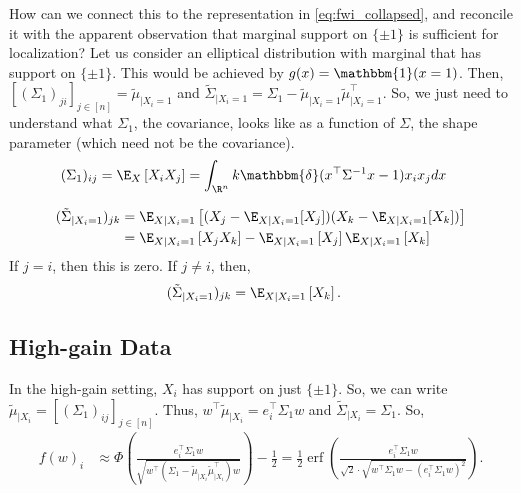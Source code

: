 \documentclass{article}
\begin{document}
How can we connect this to the representation in \cref{eq:fwi_collapsed}, and reconcile it with the apparent observation that marginal support on $\{ \pm 1 \}$ is sufficient for localization?
Let us consider an elliptical distribution with marginal that has support on $\{ \pm 1 \}$.
This would be achieved by $g(x) = \mathbbm{1}(x = 1)$. 
Then, $[(\Sigma_1)_{ji}]_{j\in[n]} = \tilde{\mu}_{\mid X_i = 1}$ and $\tilde{\Sigma}_{\mid X_i = 1} = \Sigma_1 - \tilde{\mu}_{\mid X_i = 1} \tilde{\mu}_{\mid X_i = 1}^\top$.
So, we just need to understand what $\Sigma_1$, the covariance, looks like as a function of $\Sigma$, the shape parameter (which need not be the covariance).
\begin{align*}
  (\Sigma_1)_{ij} 
  &= \E_{X} \left[ X_i X_j \right]
  = \int_{\R^n} k \mathbbm{\delta}(x^\top \Sigma^{-1} x - 1) x_i x_j dx
\end{align*}

\begin{align*}
  (\tilde{\Sigma}_{\mid X_i = 1})_{jk} 
  &= \E_{X \mid X_i = 1} \left[ (X_j - \E_{X \mid X_i = 1}[X_j]) (X_k - \E_{X \mid X_i = 1}[X_k]) \right] \\
  &= \E_{X \mid X_i = 1} \left[ X_j X_k \right] - \E_{X \mid X_i = 1} \left[ X_j \right] \E_{X \mid X_i = 1} \left[ X_k \right] \\
\end{align*}
If $j = i$, then this is zero.
If $j \neq i$, then,
\begin{align*}
  (\tilde{\Sigma}_{\mid X_i = 1})_{jk} 
  &= \E_{X \mid X_i = 1} \left[ X_k \right].
\end{align*}


\subsection{High-gain Data}
In the high-gain setting, $X_i$ has support on just $\{ \pm 1 \}$.
So, we can write $\tilde{\mu}_{\mid X_i} = [(\Sigma_1)_{ij} ]_{j\in[n]}$. %
Thus, $w^\top \tilde{\mu}_{\mid X_i} = e_i^\top \Sigma_1 w$ and $\tilde{\Sigma}_{\mid X_i} = \Sigma_1$.
So,
\begin{align}
  f(w)_i 
  &\approx \Phi\left( \frac{ e_i^\top \Sigma_1 w }{ \sqrt{ w^\top (\Sigma_1 - \tilde{\mu}_{\mid X_i} \tilde{\mu}_{\mid X_i}^\top) w } } \right) - \frac{1}{2}
  = \frac{1}{2} \operatorname{erf}\left( \frac{ e_i^\top \Sigma_1 w }{ \sqrt{2} \cdot \sqrt{ w^\top \Sigma_1 w - ( e_i^\top \Sigma_1 w )^2 } } \right). \label{eq:fi_highgain}
\end{align}
\end{document}
